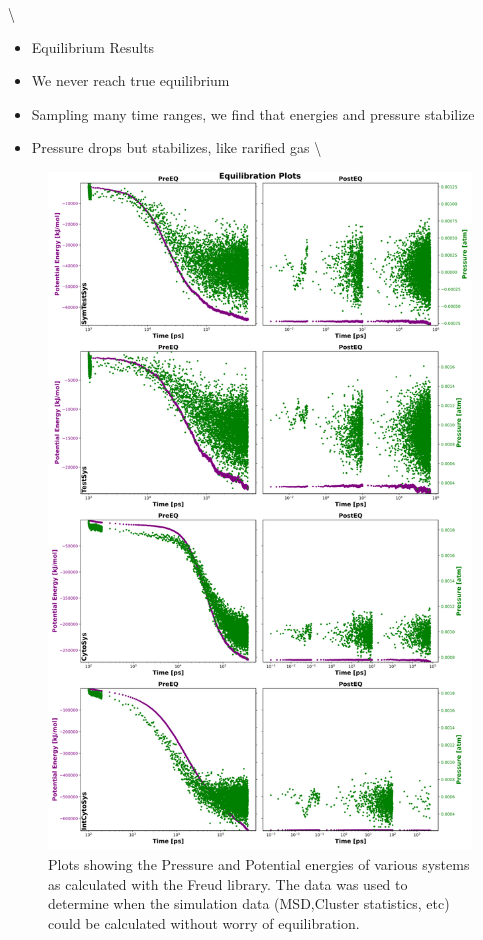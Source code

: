 \documentclass[a4paper,11pt,oneside]{book}
\begin{document}
{\textbackslash}

\begin{itemize}
\item Equilibrium Results
\end{itemize}

\begin{itemize}
\item We never reach true equilibrium
\item Sampling many time ranges, we find that energies and pressure stabilize
\item Pressure drops but stabilizes, like rarified gas
{\textbackslash}
\end{itemize}

\begin{figure}[!htbp]
\centering
\includegraphics[width=0.7\linewidth]{files/Fig3-c8f52112ab9c36b95917d32f74d7df9b.png}
\caption[]{Plots showing the Pressure and Potential energies of various systems as calculated with the Freud library. The data was used to determine when the simulation data (MSD,Cluster statistics, etc) could be calculated without worry of equilibration.}
\label{Fig3_EQ}
\end{figure}
\end{document}
